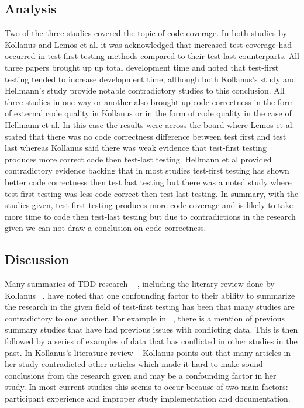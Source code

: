 \documentclass{sig-alternate}
\begin{document}
\subsection{Analysis}
Two of the three studies covered the topic of code coverage.  In both studies by Kollanus and Lemos et al. it was acknowledged that increased test coverage had occurred in test-first testing methods compared to their test-last counterparts.  All three papers brought up up total development time and noted that test-first testing tended to increase development time, although both Kollanus’s study and Hellmann’s study provide notable contradictory studies to this conclusion.   All three studies in one way or another also brought up code correctness in the form of external code quality in Kollanus or in the form of code quality in the case of Hellmann et al.  In this case the results were across the board where Lemos et al. stated that there was no code correctness difference between test first and test last whereas Kollanus said there was weak evidence that test-first testing produces more correct code then test-last testing.  Hellmann et al provided contradictory evidence backing that in most studies test-first testing has shown better code correctness then test last testing but there was a noted study where test-first testing was less code correct then test-last testing.   In summary, with the studies given, test-first testing produces more code coverage and is likely to take more time to code then test-last testing but due to contradictions in the research given we can not draw a conclusion on code correctness.

\subsection{Discussion}
Many summaries of TDD research ~\cite{Hammond:2012, Hellman:2012, Kettunen:2010} , including the literary review done by Kollanus ~\cite{Kollanus:2010}, have noted that one confounding factor to their ability to summarize the research in the given field of test-first testing has been that many studies are contradictory to one another.  For example in ~\cite{Hellman:2012},  there is a mention of previous summary studies that have had previous issues with conflicting data.  This is then followed by a series of examples of data that has conflicted in other studies in the past.  In Kollanus’s literature review ~\cite{Kollanus:2010} Kollanus points out that many articles in her study contradicted other articles which made it hard to make sound conclusions from the research given and may be a confounding factor in her study.  In most current studies this seems to occur because of two main factors: participant experience and improper study implementation and documentation.
\end{document}
